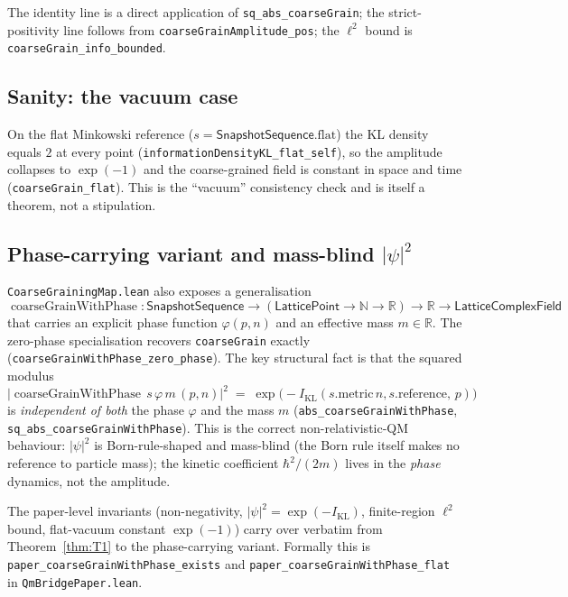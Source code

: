 \documentclass[11pt,a4paper,twoside]{article}
\theoremstyle{definition}
\newcommand{\KL}{I_{\mathrm{KL}}}
\newcommand{\Rbb}{\mathbb{R}}
\newcommand{\Nbb}{\mathbb{N}}
\newcommand{\coarseGrainWithPhase}{\operatorname{coarseGrainWithPhase}}
\newcommand{\Lfield}{\mathsf{LatticeComplexField}}
\newcommand{\SnapSeq}{\mathsf{SnapshotSequence}}
\newcommand{\code}[1]{\texttt{#1}}
\begin{document}
The identity line is a direct application of
\code{sq\_abs\_coarseGrain}; the strict-positivity line follows from
\code{coarseGrainAmplitude\_pos}; the $\ell^{2}$ bound is
\code{coarseGrain\_info\_bounded}.

\subsection{Sanity: the vacuum case}\label{sec:coarsegrain-vacuum}

On the flat Minkowski reference ($s=\SnapSeq.\mathrm{flat}$) the KL
density equals $2$ at every point
(\code{informationDensityKL\_flat\_self}), so the amplitude collapses
to $\exp(-1)$ and the coarse-grained field is constant in space and
time (\code{coarseGrain\_flat}). This is the ``vacuum'' consistency
check and is itself a theorem, not a stipulation.

\subsection{Phase-carrying variant and mass-blind
\texorpdfstring{$|\psi|^{2}$}{|psi|^2}}\label{sec:coarsegrain-phase}

\code{CoarseGrainingMap.lean} also exposes a generalisation
\[
\coarseGrainWithPhase:\SnapSeq\to(\mathsf{LatticePoint}\to\Nbb\to\Rbb)\to\Rbb
 \to\Lfield
\]
that carries an explicit phase function $\varphi(p,n)$ and an
effective mass $m\in\Rbb$. The zero-phase specialisation recovers
\code{coarseGrain} exactly (\code{coarseGrainWithPhase\_zero\_phase}).
The key structural fact is that the squared modulus
\[
|\coarseGrainWithPhase\,s\,\varphi\,m\,(p,n)|^{2}
 \;=\; \exp\!\bigl(-\KL(s.\mathrm{metric}\,n, s.\mathrm{reference},\,p)\bigr)
\]
is \emph{independent of both} the phase $\varphi$ and the mass $m$
(\code{abs\_coarseGrainWithPhase}, \code{sq\_abs\_coarseGrainWithPhase}).
This is the correct non-relativistic-QM behaviour: $|\psi|^{2}$ is
Born-rule-shaped and mass-blind (the Born rule itself makes no
reference to particle mass); the kinetic coefficient $\hbar^{2}/(2m)$
lives in the \emph{phase} dynamics, not the amplitude.

The paper-level invariants (non-negativity, $|\psi|^{2}=\exp(-\KL)$,
finite-region $\ell^{2}$ bound, flat-vacuum constant $\exp(-1)$) carry
over verbatim from Theorem~\ref{thm:T1} to the phase-carrying variant.
Formally this is \code{paper\_coarseGrainWithPhase\_exists} and
\code{paper\_coarseGrainWithPhase\_flat} in \code{QmBridgePaper.lean}.
\end{document}
